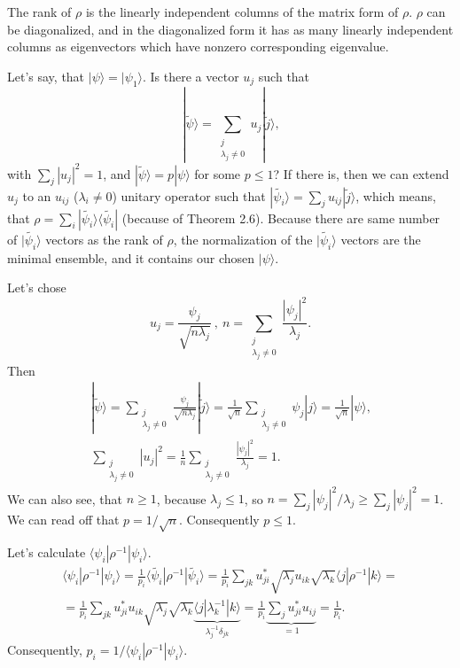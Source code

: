 \documentclass[a4paper,12pt]{article}
\newcommand{\la}{\langle}
\newcommand{\ra}{\rangle}
\begin{document}
    The rank of $\rho$ is the linearly independent columns of the matrix form of $\rho$. $\rho$ can be diagonalized, and in the diagonalized form it has as many linearly independent columns as eigenvectors which have nonzero corresponding eigenvalue.

    Let's say, that $| \psi \ra = | \psi_1 \ra$. Is there a vector $u_j$ such that
    \begin{equation}
        | \tilde{\psi} \ra = \sum_{\substack{j\\ \lambda_j \neq 0}} u_j | \tilde{j} \ra \textrm{,}
    \end{equation}
    with $\sum_j |u_j|^2 = 1$, and $| \tilde{\psi} \ra = p | \psi \ra$ for some $p \leq 1$?
    If there is, then we can extend $u_j$ to an $u_{ij}$ ($\lambda_i \neq 0$) unitary operator such that $| \tilde{\psi_i} \ra = \sum_{j} u_{ij} | \tilde{j} \ra$, which means, that $\rho = \sum_{i} | \tilde{\psi_i} \ra \la \tilde{\psi_i} |$ (because of Theorem 2.6). Because there are same number of $| \tilde{\psi_i} \ra$ vectors as the rank of $\rho$, the normalization of the $| \tilde{\psi_i} \ra$ vectors are the minimal ensemble, and it contains our chosen $| \psi \ra$.

    Let's chose
    \begin{equation}
        u_j = \frac{\psi_j}{\sqrt{n \lambda_j}} \ , \ n = \sum_{\substack{j\\ \lambda_j \neq 0}} \frac{| \psi_j |^2}{\lambda_j} \textrm{.}
    \end{equation}
    Then
    \begin{gather}
        \nonumber
        | \tilde{\psi} \ra =
        \sum_{\substack{j\\ \lambda_j \neq 0}} \frac{\psi_j}{\sqrt{n \lambda_j}} | \tilde{j} \ra =
        \frac{1}{\sqrt{n}} \sum_{\substack{j\\ \lambda_j \neq 0}} \psi_j | j \ra = \frac{1}{\sqrt{n}} | \psi \ra \textrm{,}\\
        \sum_{\substack{j\\ \lambda_j \neq 0}} | u_j |^2 = \frac{1}{n} \sum_{\substack{j\\ \lambda_j \neq 0}} \frac{| \psi_j |^2}{\lambda_j} = 1 \textrm{.}
    \end{gather}
    We can also see, that $n \geq 1$, because $\lambda_j \leq 1$, so $n = \sum_j | \psi_j |^2 / \lambda_j \geq \sum_j | \psi_j |^2 = 1$. We can read off that $p = 1/\sqrt{n}$. Consequently $p \leq 1$.

    Let's calculate $\la \psi_i | \rho^{-1} | \psi_i \ra$.
    \begin{gather}
        \nonumber
        \la \psi_i | \rho^{-1} | \psi_i \ra =
        \frac{1}{p_i} \la \tilde{\psi_i} | \rho^{-1} | \tilde{\psi_i} \ra =
        \frac{1}{p_i} \sum_{jk} u_{ji}^* \sqrt{\lambda_j} u_{ik} \sqrt{\lambda_k} \la j | \rho^{-1} | k \ra = \\
        = \frac{1}{p_i} \sum_{jk} u_{ji}^* u_{ik} \sqrt{\lambda_j} \sqrt{\lambda_k} \underbrace{\la j | \lambda_k^{-1} | k \ra}_{\lambda^{-1}_j \delta_{jk}} =
        \frac{1}{p_i} \underbrace{\sum_{j} u_{ji}^* u_{ij}}_{=1} = \frac{1}{p_i} \textrm{.}
    \end{gather}
    Consequently, $p_i = 1 / \la \psi_i | \rho^{-1} | \psi_i \ra$.
\end{document}
